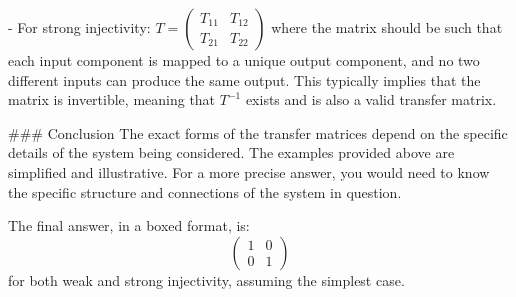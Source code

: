 - For strong injectivity: \( T = \begin{pmatrix}
T_{11} & T_{12} \\
T_{21} & T_{22}
\end{pmatrix} \)
where the matrix should be such that each input component is mapped to a unique output component, and no two different inputs can produce the same output. This typically implies that the matrix is invertible, meaning that \( T^{-1} \) exists and is also a valid transfer matrix.

### Conclusion
The exact forms of the transfer matrices depend on the specific details of the system being considered. The examples provided above are simplified and illustrative. For a more precise answer, you would need to know the specific structure and connections of the system in question.

The final answer, in a boxed format, is:
\[
\boxed{
\begin{pmatrix}
1 & 0 \\
0 & 1
\end{pmatrix}
}
\]
for both weak and strong injectivity, assuming the simplest case.